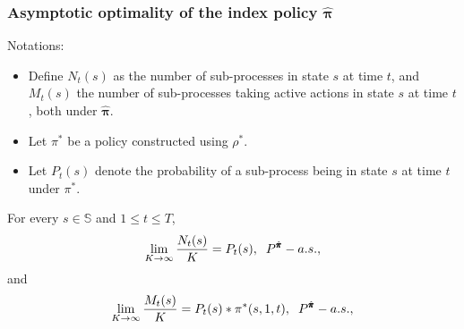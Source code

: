 \documentclass{beamer}
\newcommand{\allp}{\pmb{\pi}}
\newcommand{\subp}{\pi}
\newcommand{\substates}{\mathbb{S}}
\begin{document}
\begin{frame}[plain]
\frametitle{Asymptotic optimality of the index policy $\hat{\allp}$}
Notations:
\begin{itemize}
\item Define $N_t(s)$ as the number of sub-processes in state $s$ at time $t$, and $M_t(s)$ the number of sub-processes taking active actions in state $s$ at time $t$, both under $\hat{\allp}$.
\item Let $\pi^{*}$ be a policy constructed using $\rho^*$.
\item Let $P_t(s)$ denote the probability of a sub-process being in state $s$ at time $t$ under $\pi^*$.
\end{itemize}
\begin{theorem}[2]\label{th:conv}
For every $s\in\substates$ and $1\leq t\leq T$,
\begin{equation}\label{conv1}
\lim_{K\rightarrow\infty}\frac{N_t(s)}{K} = P_t(s), \hspace{2mm} P^{\hat{\allp}}-a.s.,
\end{equation}
and
\begin{equation}\label{conv2}
\lim_{K\rightarrow\infty}\frac{M_t(s)}{K} = P_t(s)*\subp^*(s,1,t), \hspace{2mm} P^{\hat{\allp}}-a.s., 
\end{equation}
\end{theorem}
\end{frame}
\end{document}
